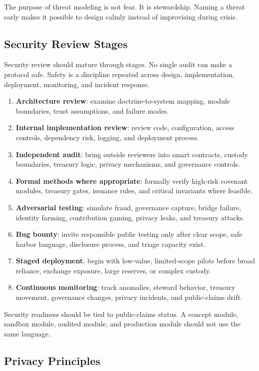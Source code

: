 \documentclass[12pt]{article}
\begin{document}
The purpose of threat modeling is not fear. It is stewardship. Naming a threat early makes it possible to design calmly instead of improvising during crisis.

\subsection{Security Review Stages}

Security review should mature through stages. No single audit can make a protocol safe. Safety is a discipline repeated across design, implementation, deployment, monitoring, and incident response.

\begin{enumerate}
  \item \textbf{Architecture review}: examine doctrine-to-system mapping, module boundaries, trust assumptions, and failure modes.
  \item \textbf{Internal implementation review}: review code, configuration, access controls, dependency risk, logging, and deployment process.
  \item \textbf{Independent audit}: bring outside reviewers into smart contracts, custody boundaries, treasury logic, privacy mechanisms, and governance controls.
  \item \textbf{Formal methods where appropriate}: formally verify high-risk covenant modules, treasury gates, issuance rules, and critical invariants where feasible.
  \item \textbf{Adversarial testing}: simulate fraud, governance capture, bridge failure, identity farming, contribution gaming, privacy leaks, and treasury attacks.
  \item \textbf{Bug bounty}: invite responsible public testing only after clear scope, safe harbor language, disclosure process, and triage capacity exist.
  \item \textbf{Staged deployment}: begin with low-value, limited-scope pilots before broad reliance, exchange exposure, large reserves, or complex custody.
  \item \textbf{Continuous monitoring}: track anomalies, steward behavior, treasury movement, governance changes, privacy incidents, and public-claims drift.
\end{enumerate}

Security readiness should be tied to public-claims status. A concept module, sandbox module, audited module, and production module should not use the same language.

\subsection{Privacy Principles}
\end{document}
